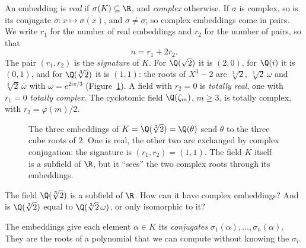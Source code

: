An embedding is \emph{real} if $\sigma(K)\subseteq\R$, and \emph{complex} otherwise. If $\sigma$ is complex, so is its
conjugate $\bar\sigma:x\mapsto\overline{\sigma(x)}$, and $\bar\sigma\ne\sigma$; so complex embeddings come in pairs.
We write $r_1$ for the number of real embeddings and $r_2$ for the number of pairs, so that
\[
n=r_1+2r_2.
\]
The pair $(r_1,r_2)$ is the \emph{signature} of $K$. For $\Q(\sqrt2)$ it is $(2,0)$, for $\Q(i)$ it is $(0,1)$, and
for $\Q(\sqrt[3]2)$ it is $(1,1)$: the roots of $X^3-2$ are $\sqrt[3]2$, $\sqrt[3]2\,\omega$ and $\sqrt[3]2\,\bar\omega$
with $\omega=e^{2i\pi/3}$ (Figure~\ref{fig:embeddings}). A field with $r_2=0$ is \emph{totally real}, one with $r_1=0$
\emph{totally complex}. The cyclotomic field $\Q(\zeta_m)$, $m\ge3$, is totally complex, with $r_2=\varphi(m)/2$.

\begin{figure}[ht]
\centering
{}
\caption{The three embeddings of $K=\Q(\sqrt[3]2)=\Q(\theta)$ send $\theta$ to the three cube roots of $2$. One is real,
the other two are exchanged by complex conjugation: the signature is $(r_1,r_2)=(1,1)$. The field $K$ itself is a
subfield of $\R$, but it ``sees'' the two complex roots through its embeddings.}
\label{fig:embeddings}
\end{figure}

\begin{think}
The field $\Q(\sqrt[3]2)$ is a subfield of $\R$. How can it have complex embeddings? And is $\Q(\sqrt[3]2)$ equal to
$\Q(\sqrt[3]2\,\omega)$, or only isomorphic to it?
\end{think}

The embeddings give each element $\alpha\in K$ its \emph{conjugates} $\sigma_1(\alpha),\dots,\sigma_n(\alpha)$. They
are the roots of a polynomial that we can compute without knowing the $\sigma_i$.

